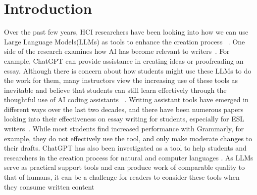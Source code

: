 \documentclass[sigconf]{acmart}
\begin{document}
\maketitle

\section{Introduction}

Over the past few years, HCI researchers have been looking into how we can use Large Language Models(LLMs) as tools to enhance the creation process ~\cite{gero_social_2023,zhang_visar_2023, han_recipe_2023}. One side of the research examines how AI has become relevant to writers~\cite{gero_social_2023, zhang_visar_2023}. For example, ChatGPT can provide assistance in creating ideas or proofreading an essay. Although there is concern about how students might use these LLMs to do the work for them, many instructors view the increasing use of these tools as inevitable and believe that students can still learn effectively through the thoughtful use of AI coding assistants ~\cite{wang2023exploring}. Writing assistant tools have emerged in different ways over the last two decades, and there have been numerous papers looking into their effectiveness on essay writing for students, especially for ESL writers~\cite{huang_effectiveness_2020, dong_using_2021,jayavalan_effectiveness_2018, karyuatry_grammarly_2018, oneill_stop_2019, koltovskaia_student_2020}. While most students find increased performance with Grammarly, for example, they do not effectively use the tool, and only make moderate changes to their drafts. ChatGPT has also been investigated as a tool to help students and researchers in the creation process for natural and computer languages \cite{shoufan_can_2023, liu_check_2023, murillo_engineering_nodate, stark_can_nodate}. As LLMs serve as practical support tools and can produce work of comparable quality to that of humans, it can be a challenge for readers to consider these tools when they consume written content %
\end{document}
